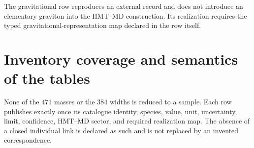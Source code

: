 The gravitational row reproduces an external record and does not introduce an elementary
graviton into the HMT--MD construction. Its realization requires the typed
gravitational-representation map declared in the row itself.

\section{Inventory coverage and semantics of the tables}

None of the \(471\) masses or the \(384\) widths is reduced to a sample. Each row publishes exactly once its catalogue identity, species, value, unit, uncertainty, limit, confidence, HMT--MD sector, and required realization map. The absence of a closed individual link is declared as such and is not replaced by an invented correspondence. \clearpage
